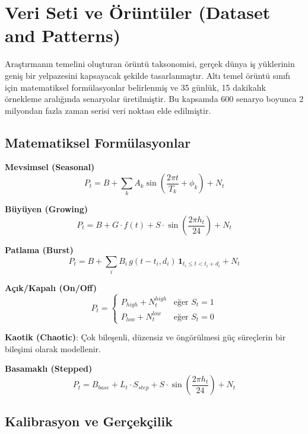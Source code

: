\section{Veri Seti ve Örüntüler (Dataset and Patterns)}

Araştırmanın temelini oluşturan örüntü taksonomisi, gerçek dünya iş yüklerinin geniş bir yelpazesini kapsayacak şekilde tasarlanmıştır. Altı temel örüntü sınıfı için matematiksel formülasyonlar belirlenmiş ve 35 günlük, 15 dakikalık örnekleme aralığında senaryolar üretilmiştir. Bu kapsamda 600 senaryo boyunca 2 milyondan fazla zaman serisi veri noktası elde edilmiştir.

\subsection{Matematiksel Formülasyonlar}

\textbf{Mevsimsel (Seasonal)}
\begin{equation}
P_t = B + \sum_k A_k \sin\left(\frac{2\pi t}{T_k} + \phi_k\right) + N_t
\end{equation}

\textbf{Büyüyen (Growing)}
\begin{equation}
P_t = B + G\cdot f(t) + S \cdot \sin\left(\frac{2\pi h_t}{24}\right) + N_t
\end{equation}

\textbf{Patlama (Burst)}
\begin{equation}
P_t = B + \sum_i B_i\, g(t - t_i, d_i)\, \mathbf{1}_{t_i \le t < t_i + d_i} + N_t
\end{equation}

\textbf{Açık/Kapalı (On/Off)}
\begin{equation}
P_t = \begin{cases}
P_{high} + N_t^{high} & \text{eğer } S_t = 1 \\
P_{low} + N_t^{low} & \text{eğer } S_t = 0
\end{cases}
\end{equation}

\textbf{Kaotik (Chaotic)}: Çok bileşenli, düzensiz ve öngörülmesi güç süreçlerin bir bileşimi olarak modellenir.

\textbf{Basamaklı (Stepped)}
\begin{equation}
P_t = B_{base} + L_t \cdot S_{step} + S \cdot \sin\left(\frac{2\pi h_t}{24}\right) + N_t
\end{equation}

\subsection{Kalibrasyon ve Gerçekçilik}

